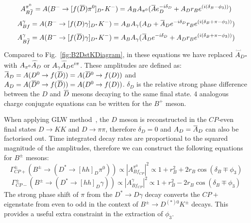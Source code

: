 \documentclass[oneside,12pt]{article}
\newcommand{\overbar}[1]{\mkern 1.5mu\overline{\mkern-1.5mu#1\mkern-1.5mu}\mkern
1.5mu}
\newcommand\brobor{\smash[b]{\raisebox{0.6\height}{\scalebox{0.5}{\tiny(}}{\mkern-1.5mu\scriptstyle-\mkern-1.5mu}\raisebox{0.6\height}{\scalebox{0.5}{\tiny)}}}}
\begin{document}
  \begin{equation}
		A_{B\overbar{f}}^{\pi^{0}}=A(B^{-}\rightarrow
[f(\overbar{D})\pi^{0}]_{D^{*}}K^{-})=A_{B}A_{\pi^{0}}(\overbar{A}e^{-i\delta_D}_{D}+A_{D}r_{B}e^{(i(\delta_{B}-\phi_{3}))})
\label{eq:A(Bfbar)pi0}
  \end{equation}
  \begin{equation}
    A_{Bf}^{\gamma}=A(B^{-}\rightarrow
    [f(D)\gamma]_{D^{*}}K^{-})=A_{B}A_{\gamma}(A_{D}+\overbar{A}_{D}e^{-i\delta_D}r_{B}e^{(i(\delta_{B}+\pi-\phi_{3}))})
    \label{eq:A(Bf)gamma}
  \end{equation}
  \begin{equation}
		A_{B\overbar{f}}^{\gamma}=A(B^{-}\rightarrow
[f(\overbar{D})\gamma]_{D^{*}}K^{-})=A_{B}A_{\gamma}(\overbar{A}_{D}e^{-i\delta_D}+A_{D}r_{B}e^{(i(\delta_{B}+\pi-\phi_{3}))})
\label{eq:A(Bfbar)gamma}
  \end{equation}
\noindent Compared to Fig.~\ref{fig:B2DstKDiagram}, in these equations we have
replaced $\accentset{\brobor}{A}\phantom{}_{D^{*}}$ with
$A_{\pi^{0}}\accentset{\brobor}{A}\phantom{}_{D}$ or
$A_{\gamma}\accentset{\brobor}{A}\phantom{}_{D}e^{{i\pi}}$. These amplitudes
are defined as: $\overbar{A}_{D}=A(D^{0}\rightarrow
f(\overbar{D}))=A(\overbar{D}^{0}\rightarrow f(D))$ and
$A_{D}=A(\overbar{D}^{0}\rightarrow f(\overbar{D}))=A(D^{0}\rightarrow f(D))$.
$\delta_D$ is the relative strong phase difference between the $D$ and
$\overbar{D}$ mesons decaying to the same final state. 4 analogous charge
conjugate equations can be written for the $B^{+}$ meson. 

When applying GLW method~\cite{GLWRef}, the $D$ meson is reconstructed in the
$CP$-even final states $D\rightarrow KK$ and $D\rightarrow \pi \pi$, therefore
$\delta_D=0$ and $A_{D}=\overbar{A}_{D}$ can also be factorised out. Time integrated decay rates are proportional to the squared magnitude of the amplitudes, therefore we can construct the following equations for $B^{\pm}$ mesons:
  \begin{equation}
		\Gamma_{CP+}^{\pm}(B^{\pm}\rightarrow (D^{*}\rightarrow
[hh]_D\pi^{0}))\propto |A^{\pi^0}_{Bf_{CP}}|^2 \propto 1 + r_{B}^{2} +
2r_{B}\cos(\delta_{B}\mp \phi_{3}) \label{eq:DecayRateGLWpi0}
  \end{equation}
  \begin{equation}
		\Gamma_{CP-}^{\pm}(B^{\pm}\rightarrow (D^{*}\rightarrow
[hh]_D\gamma))\propto |A^{\gamma}_{Bf_{CP}}|^2 \propto 1 + r_{B}^{2} -
2r_{B}\cos(\delta_{B}\mp \phi_{3}) \label{eq:DecayRateGLWgamma}
  \end{equation}
\noindent The strong phase shift of $\pi$ from the
$D^{*}\rightarrow D\gamma$ decay converts the $CP+$ eigenstate from even to odd
in the context of $B^{\pm}\rightarrow D^{(*)0}K^{\pm}$ decays. This provides a
useful extra constraint in the extraction of $\phi_3$. 
\end{document}
